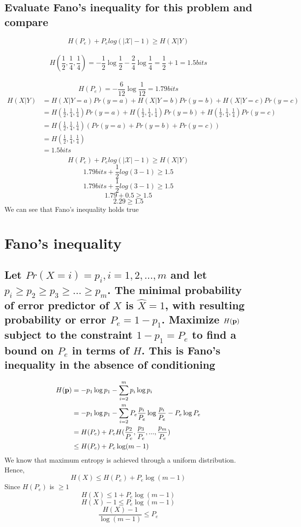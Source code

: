 \documentclass[11pt, oneside]{book}   	%
\begin{document}
\subsection{Evaluate Fano's inequality for this problem and compare}
$$H(P_e) + P_e log(|\mathcal{X}|-1) \geq H(X|Y)$$\\
$$H(\frac{1}{2}, \frac{1}{4}, \frac{1}{4}) = -\frac{1}{2}\log\frac{1}{2} - \frac{2}{4}\log\frac{1}{4} = \frac{1}{2} + 1 = 1.5 bits$$\\
$$H(P_e) = -\frac{6}{12} \log\frac{1}{12} = 1.79bits$$
\begin{equation}\label{}
\begin{split}
H(X|Y) & = H(X|Y=a)Pr(y=a) + H(X|Y=b)Pr(y=b) + H(X|Y=c)Pr(y=c) \\
& = H(\frac{1}{2}, \frac{1}{4}, \frac{1}{4})Pr(y=a) + H(\frac{1}{2}, \frac{1}{4}, \frac{1}{4})Pr(y=b) + H(\frac{1}{2}, \frac{1}{4}, \frac{1}{4})Pr(y=c) \\
& = H(\frac{1}{2}, \frac{1}{4}, \frac{1}{4})(Pr(y=a)+Pr(y=b)+Pr(y=c)) \\
& = H(\frac{1}{2}, \frac{1}{4}, \frac{1}{4}) \\
& = 1.5bits \\
\end{split}
\end{equation}
$$H(P_e) + P_e log(|\mathcal{X}|-1) \geq H(X|Y)$$
$$1.79bits + \frac{1}{2} log(3-1) \geq 1.5$$
$$1.79bits + \frac{1}{2} log(3-1) \geq 1.5$$
$$1.79 + 0.5  \geq 1.5$$
$$2.29 \geq 1.5$$
We can see that Fano's inequality holds true

\section{Fano's inequality}
\subsection*{Let $Pr(X=i) = p_i, i = 1, 2, ..., m$ and let $p_i \geq p_2 \geq p_3 \geq ... \geq p_m$.  The minimal probability of error predictor of $X$ is $\hat{X} = 1$, with resulting probability or error $P_e = 1-p_1$. Maximize $H(\bold{p})$ subject to the constraint $1-p_1 = P_e$ to find a bound on $P_e$ in terms of $H$.  This is Fano's inequality in the absence of conditioning}

\begin{equation}\label{}
\begin{split}
H(\bold{p}) & = -p_1 \log p_1 - \sum_{i=2}^{m} p_i \log p_i \\
& = -p_1 \log p_1 - \sum_{i=2}^{m} P_e \frac{p_i}{P_e} \log \frac{p_i}{P_e} - P_e \log P_e \\
& = H(P_e) + P_e H (\frac{p_2}{P_e}, \frac{p_3}{P_e},...,\frac{p_m}{P_e}) \\
& \leq H(P_e) + P_e \log (m-1)
\end{split}
\end{equation}
We know that maximum entropy is achieved through a uniform distribution.  Hence, 
$$H(X) \leq H(P_e) + P_e \log(m-1)$$
Since $H(P_e)$ is $\geq 1$
$$H(X) \leq 1 + P_e \log(m-1)$$
$$H(X)-1 \leq P_e \log (m-1)$$
$$\frac{H(X)-1}{\log(m-1)} \leq P_e$$
\end{document}
